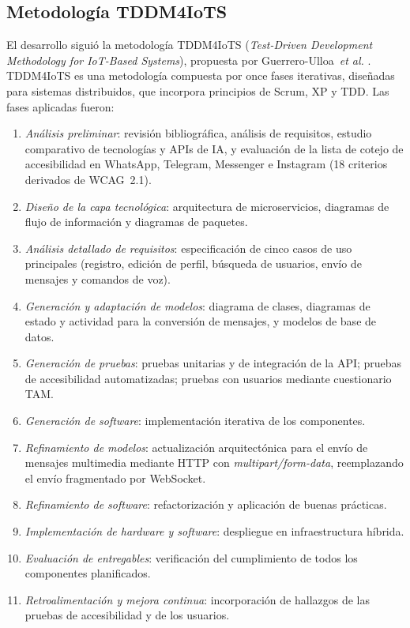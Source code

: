 \documentclass[journal]{IEEEtran}
\begin{document}
\subsection{Metodolog\'ia TDDM4IoTS}

El desarrollo sigui\'o la metodolog\'ia TDDM4IoTS (\textit{Test-Driven Development Methodology for IoT-Based Systems}), propuesta por Guerrero-Ulloa~\textit{et al.} \cite{guerrero2020}. TDDM4IoTS es una metodolog\'ia compuesta por once fases iterativas, dise\~nadas para sistemas distribuidos, que incorpora principios de Scrum, XP y TDD. Las fases aplicadas fueron:

\begin{enumerate}
    \item \textit{An\'alisis preliminar}: revisi\'on bibliogr\'afica, an\'alisis de requisitos, estudio comparativo de tecnolog\'ias y APIs de IA, y evaluaci\'on de la lista de cotejo de accesibilidad en WhatsApp, Telegram, Messenger e Instagram (18 criterios derivados de WCAG~2.1).
    \item \textit{Dise\~no de la capa tecnol\'ogica}: arquitectura de microservicios, diagramas de flujo de informaci\'on y diagramas de paquetes.
    \item \textit{An\'alisis detallado de requisitos}: especificaci\'on de cinco casos de uso principales (registro, edici\'on de perfil, b\'usqueda de usuarios, env\'io de mensajes y comandos de voz).
    \item \textit{Generaci\'on y adaptaci\'on de modelos}: diagrama de clases, diagramas de estado y actividad para la conversi\'on de mensajes, y modelos de base de datos.
    \item \textit{Generaci\'on de pruebas}: pruebas unitarias y de integraci\'on de la API; pruebas de accesibilidad automatizadas; pruebas con usuarios mediante cuestionario TAM.
    \item \textit{Generaci\'on de software}: implementaci\'on iterativa de los componentes.
    \item \textit{Refinamiento de modelos}: actualizaci\'on arquitect\'onica para el env\'io de mensajes multimedia mediante HTTP con \textit{multipart/form-data}, reemplazando el env\'io fragmentado por WebSocket.
    \item \textit{Refinamiento de software}: refactorizaci\'on y aplicaci\'on de buenas pr\'acticas.
    \item \textit{Implementaci\'on de hardware y software}: despliegue en infraestructura h\'ibrida.
    \item \textit{Evaluaci\'on de entregables}: verificaci\'on del cumplimiento de todos los componentes planificados.
    \item \textit{Retroalimentaci\'on y mejora continua}: incorporaci\'on de hallazgos de las pruebas de accesibilidad y de los usuarios.
\end{enumerate}
\end{document}
